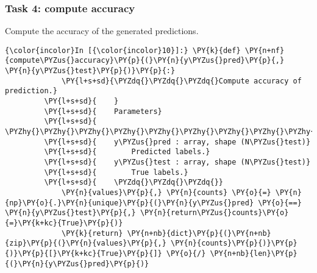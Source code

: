     \hypertarget{task-4-compute-accuracy}{%
\subsubsection{Task 4: compute accuracy}\label{task-4-compute-accuracy}}

Compute the accuracy of the generated predictions.

    \begin{Verbatim}[commandchars=\\\{\}]
{\color{incolor}In [{\color{incolor}10}]:} \PY{k}{def} \PY{n+nf}{compute\PYZus{}accuracy}\PY{p}{(}\PY{n}{y\PYZus{}pred}\PY{p}{,} \PY{n}{y\PYZus{}test}\PY{p}{)}\PY{p}{:}
             \PY{l+s+sd}{\PYZdq{}\PYZdq{}\PYZdq{}Compute accuracy of prediction.}
         \PY{l+s+sd}{    }
         \PY{l+s+sd}{    Parameters}
         \PY{l+s+sd}{    \PYZhy{}\PYZhy{}\PYZhy{}\PYZhy{}\PYZhy{}\PYZhy{}\PYZhy{}\PYZhy{}\PYZhy{}\PYZhy{}}
         \PY{l+s+sd}{    y\PYZus{}pred : array, shape (N\PYZus{}test)}
         \PY{l+s+sd}{        Predicted labels.}
         \PY{l+s+sd}{    y\PYZus{}test : array, shape (N\PYZus{}test)}
         \PY{l+s+sd}{        True labels.}
         \PY{l+s+sd}{    \PYZdq{}\PYZdq{}\PYZdq{}}
             \PY{n}{values}\PY{p}{,} \PY{n}{counts} \PY{o}{=} \PY{n}{np}\PY{o}{.}\PY{n}{unique}\PY{p}{(}\PY{n}{y\PYZus{}pred} \PY{o}{==} \PY{n}{y\PYZus{}test}\PY{p}{,} \PY{n}{return\PYZus{}counts}\PY{o}{=}\PY{k+kc}{True}\PY{p}{)}
             \PY{k}{return} \PY{n+nb}{dict}\PY{p}{(}\PY{n+nb}{zip}\PY{p}{(}\PY{n}{values}\PY{p}{,} \PY{n}{counts}\PY{p}{)}\PY{p}{)}\PY{p}{[}\PY{k+kc}{True}\PY{p}{]} \PY{o}{/} \PY{n+nb}{len}\PY{p}{(}\PY{n}{y\PYZus{}pred}\PY{p}{)}
\end{Verbatim}


